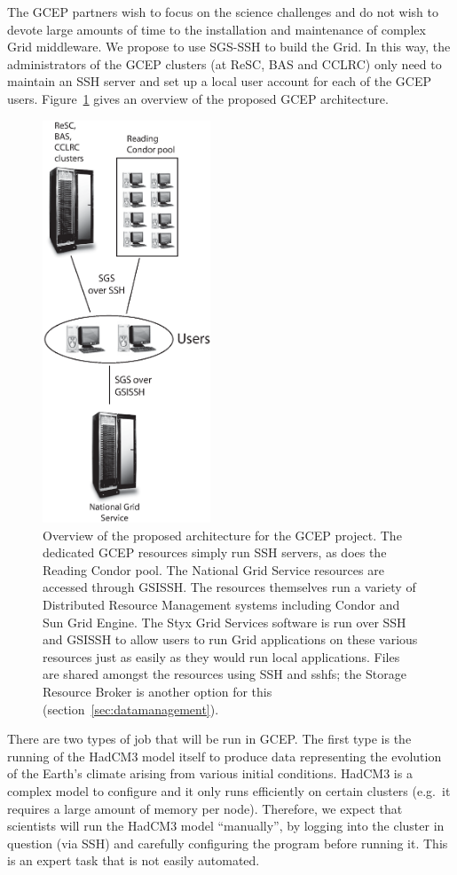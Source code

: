 \documentclass[times,10pt,twocolumn]{article}
\begin{document}

The GCEP partners wish to focus on the science challenges and do not wish to devote large amounts of time to the installation and maintenance of complex Grid middleware.  We propose to use SGS-SSH to build the Grid.  In this way, the administrators of the GCEP clusters (at ReSC, BAS and CCLRC) only need to maintain an SSH server and set up a local user account for each of the GCEP users.  Figure~\ref{fig:gcep} gives an overview of the proposed GCEP architecture.

\begin{figure}
\centering
\includegraphics[height=12cm]{GCEP_architecture.eps}
\caption{Overview of the proposed architecture for the GCEP project. The dedicated GCEP resources simply run SSH servers, as does the Reading Condor pool.  The National Grid Service resources are accessed through GSISSH.  The resources themselves run a variety of Distributed Resource Management systems including Condor and Sun Grid Engine.  The Styx Grid Services software is run over SSH and GSISSH to allow users to run Grid applications on these various resources just as easily as they would run local applications.  Files are shared amongst the resources using SSH and sshfs; the Storage Resource Broker is another option for this (section~\ref{sec:datamanagement}).} 
\label{fig:gcep}
\end{figure}

There are two types of job that will be run in GCEP.  The first type is the running of the HadCM3 model itself to produce data representing the evolution of the Earth's climate arising from various initial conditions.  HadCM3 is a complex model to configure and it only runs efficiently on certain clusters (e.g.\ it requires a large amount of memory per node).  Therefore, we expect that scientists will run the HadCM3 model ``manually'', by logging into the cluster in question (via SSH) and carefully configuring the program before running it.  This is an expert task that is not easily automated.
\end{document}
